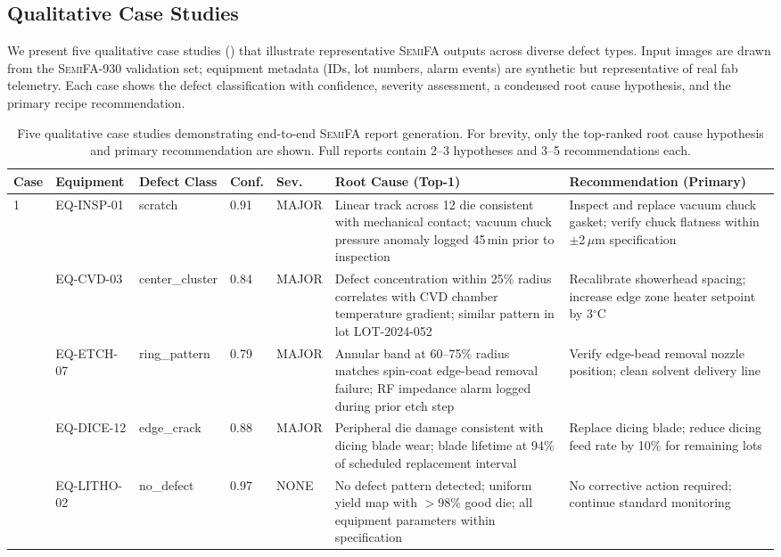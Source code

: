 \documentclass[conference]{IEEEtran}
\newcommand{\semifa}{\textsc{SemiFA}}
\newcommand{\semidataset}{\textsc{SemiFA-930}}
\begin{document}
\subsection{Qualitative Case Studies}

We present five qualitative case studies () that illustrate representative \semifa{} outputs across diverse defect types.
Input images are drawn from the \semidataset{} validation set; equipment metadata (IDs, lot numbers, alarm events) are synthetic but representative of real fab telemetry.
Each case shows the defect classification with confidence, severity assessment, a condensed root cause hypothesis, and the primary recipe recommendation.

\begin{table}[t]
    \centering
    \caption{Five qualitative case studies demonstrating end-to-end \semifa{} report generation. For brevity, only the top-ranked root cause hypothesis and primary recommendation are shown. Full reports contain 2--3 hypotheses and 3--5 recommendations each.}
    \label{tab:case_studies}
    \begin{tabular}{@{}p{0.8cm}p{1.8cm}p{1.8cm}p{1cm}p{1cm}p{4.2cm}p{4.2cm}@{}}
        \toprule
        \textbf{Case} & \textbf{Equipment} & \textbf{Defect Class} & \textbf{Conf.} & \textbf{Sev.} & \textbf{Root Cause (Top-1)} & \textbf{Recommendation (Primary)} \\
        \midrule
        1 & EQ-INSP-01 & scratch & 0.91 & MAJOR & Linear track across 12 die consistent with mechanical contact; vacuum chuck pressure anomaly logged 45\,min prior to inspection & Inspect and replace vacuum chuck gasket; verify chuck flatness within $\pm$2\,$\mu$m specification \\
        \addlinespace
        2 & EQ-CVD-03 & center\_cluster & 0.84 & MAJOR & Defect concentration within 25\% radius correlates with CVD chamber temperature gradient; similar pattern in lot LOT-2024-052 & Recalibrate showerhead spacing; increase edge zone heater setpoint by 3$^{\circ}$C \\
        \addlinespace
        3 & EQ-ETCH-07 & ring\_pattern & 0.79 & MAJOR & Annular band at 60--75\% radius matches spin-coat edge-bead removal failure; RF impedance alarm logged during prior etch step & Verify edge-bead removal nozzle position; clean solvent delivery line \\
        \addlinespace
        4 & EQ-DICE-12 & edge\_crack & 0.88 & MAJOR & Peripheral die damage consistent with dicing blade wear; blade lifetime at 94\% of scheduled replacement interval & Replace dicing blade; reduce dicing feed rate by 10\% for remaining lots \\
        \addlinespace
        5 & EQ-LITHO-02 & no\_defect & 0.97 & NONE & No defect pattern detected; uniform yield map with $>$98\% good die; all equipment parameters within specification & No corrective action required; continue standard monitoring \\
        \bottomrule
    \end{tabular}
\end{table}
\end{document}
